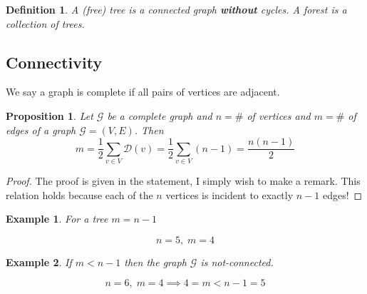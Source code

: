 \documentclass[9pt]{article} %
\newtheorem*{def_}{Definition}
\newtheorem{prop}{Proposition}
\newtheorem{ex}{Example}
\newcommand{\G}{\mathcal{G}}
\begin{document}
		
		\begin{def_}
			A (free) tree is a connected graph \textbf{without} cycles. A forest is a collection of trees.
		\end{def_}
		
		\subsection*{Connectivity}
		
		We say a graph is complete if all pairs of vertices are adjacent. 
		\begin{prop}
			Let $\G$ be a complete graph and $n = \#$ of vertices and $m = \#$ of edges of a graph $\G=(V,E)$. Then
			\begin{equation}
			m = \frac{1}{2} \sum_{v \in V} \mathcal{D}(v) = \frac{1}{2} \sum_{v \in V} (n-1) = \frac{n(n-1)}{2}
			\end{equation}
		\end{prop}
		\begin{proof}
			The proof is given in the statement, I simply wish to make a remark. This relation holds because each of the $n$ vertices is incident to exactly $n-1$ edges!
		\end{proof}
		\begin{ex} 
			For a tree $m=n-1$
			$$ $$
			\begin{center}
				
				$$ n =5, \; m = 4$$
			\end{center}
		\end{ex}
		
		\begin{ex} 
			If $m < n-1$ then the graph $\G$ is not-connected.
			$$ $$
			\begin{center}
				
				$$ n =6, \; m = 4 \implies 4=m < n-1 = 5$$
			\end{center}
		\end{ex}
\end{document}
